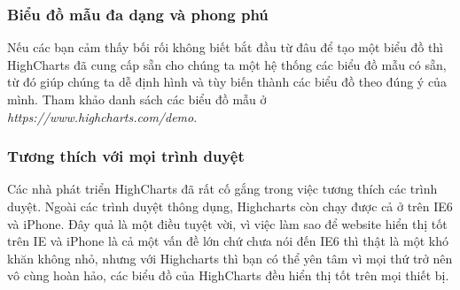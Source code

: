 \subsubsection{Biểu đồ mẫu đa dạng và phong phú}
Nếu các bạn cảm thấy bối rối không biết bắt đầu từ đâu để tạo một biểu đồ thì HighCharts đã cung cấp sẵn cho chúng ta một hệ thống các biểu đồ mẫu có sẵn, từ đó giúp chúng ta dễ định hình và tùy biến thành các biểu đồ theo đúng ý của mình. Tham khảo danh sách các biểu đồ mẫu ở {\it https://www.highcharts.com/demo}.

\subsubsection{Tương thích với mọi trình duyệt}
Các nhà phát triển HighCharts đã rất cố gắng trong việc tương thích các trình duyệt. Ngoài các trình duyệt thông dụng, Highcharts còn chạy được cả ở trên IE6 và iPhone. Đây quả là một điều tuyệt vời, vì việc làm sao để website hiển thị tốt trên IE và iPhone là cả một vấn đề lớn chứ chưa nói đến IE6 thì thật là một khó khăn không nhỏ, nhưng với Highcharts thì bạn có thể yên tâm vì mọi thứ trở nên vô cùng hoàn hảo, các biểu đồ của HighCharts đều hiển thị tốt trên mọi thiết bị.